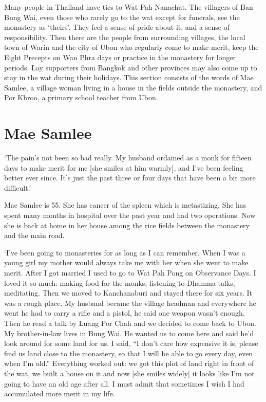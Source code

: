 
Many people in Thailand have ties to Wat Pah Nanachat. The
villagers of Ban Bung Wai, even those who rarely go to the wat except
for funerals, see the monastery as `theirs'. They feel a sense of pride
about it, and a sense of responsibility. Then there are the people from
surrounding villages, the local town of Warin and the city of Ubon who
regularly come to make merit, keep the Eight Precepts on Wan Phra days
or practice in the monastery for longer periods. Lay supporters from
Bangkok and other provinces may also come up to stay in the wat during
their holidays. This section consists of the words of Mae Samlee, a
village woman living in a house in the fields outside the monastery, and
Por Khroo, a primary school teacher from Ubon.

\section{Mae Samlee}

`The pain's not been so bad really. My husband ordained as a monk for
fifteen days to make merit for me [she smiles at him warmly], and
I've been feeling better ever since. It's just the past three or four
days that have been a bit more difficult.'

Mae Samlee is 55. She has cancer of the spleen which is metastizing. She
has spent many months in hospital over the past year and had two
operations. Now she is back at home in her house among the rice fields
between the monastery and the main road. 

`I've been going to monasteries for as long as I can remember. When I
was a young girl my mother would always take me with her when she went
to make merit. After I got married I used to go to Wat Pah Pong on
Observance Days. I loved it so much: making food for the monks, 
listening to Dhamma talks, meditating. Then we moved to Kanchanaburi and
stayed there for six years. It was a rough place. My husband became the
village headman and everywhere he went he had to carry a rifle and a
pistol, he said one weapon wasn't enough. Then he read a talk by Luang
Por Chah and we decided to come back to Ubon. My brother-in-law lives in
Bung Wai. He wanted us to come here and said he'd look around for some
land for us. I said, ``I don't care how expensive it is, please find us
land close to the monastery, so that I will be able to go every day, 
even when I'm old.'' Everything worked out: we got this plot of land
right in front of the wat, we built a house on it and now [she smiles
widely] it looks like I'm not going to have an old age after all. I
must admit that sometimes I wish I had accumulated more merit in my
life. 

